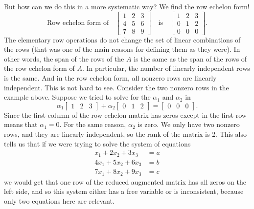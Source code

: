 \documentclass{ximera}
\begin{document}
But how can we do this in a more systematic way?  We find the row echelon form!
\begin{equation*}
    \text{Row echelon form of} \quad
    \begin{bmatrix}
        1 & 2 & 3 \\
        4 & 5 & 6  \\
        7 & 8 & 9
    \end{bmatrix}
    \quad \text{is} \quad
    \begin{bmatrix}
        1 & 2 & 3 \\
        0 & 1 & 2  \\
        0 & 0 & 0
    \end{bmatrix} .
\end{equation*}
The elementary row operations do not change the set of linear combinations of the rows (that was one of the main reasons for defining them as they were). In other words, the span of the rows of the $A$ is the same as the span of the rows of the row echelon form of $A$. In particular, the number of linearly independent rows is the same. And in the row echelon form, all nonzero rows are linearly independent. This is not hard to see. Consider the two nonzero rows in the example above. Suppose we  tried to solve for the $\alpha_1$ and $\alpha_2$ in
\begin{equation*}
    \alpha_1
    \begin{bmatrix}
        1 & 2 & 3
    \end{bmatrix} 
    + \alpha_2
    \begin{bmatrix}
        0 & 1 & 2 
    \end{bmatrix} =
    \begin{bmatrix}
        0 & 0 & 0
    \end{bmatrix} .
\end{equation*}
Since the first column of the row echelon matrix has zeros except in the first row means that $\alpha_1 = 0$.  For the same reason, $\alpha_2$ is zero. We only have two nonzero rows, and they are linearly independent, so the rank of the matrix is 2. This also tells us that if we were trying to solve the system of equations
\begin{equation*}
    \begin{split}
        x_1 + 2x_2 + 3x_3 &= a \\
        4x_1 + 5x_2 + 6x_3 &= b \\
        7x_1 + 8x_2 + 9x_3 &= c
    \end{split}
\end{equation*}
we would get that one row of the reduced augmented matrix has all zeros on the left side, and so this system either has a free variable or is inconsistent, because only two equations here are relevant. 
\end{document}
